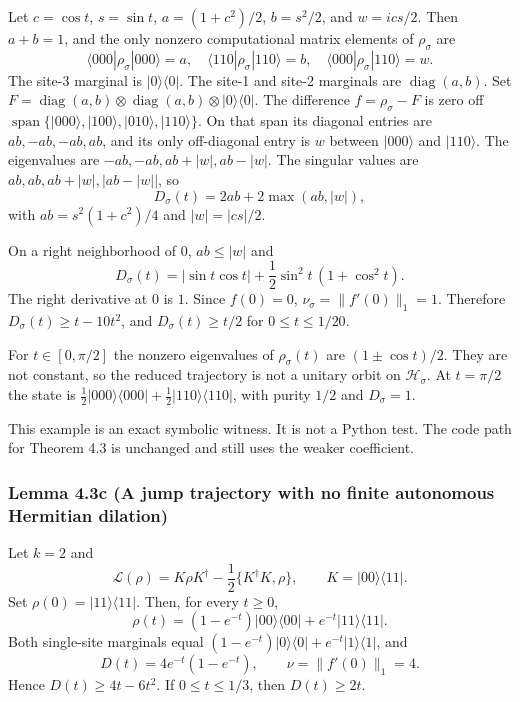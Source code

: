 \documentclass[
  11pt,
]{article}
\begin{document}
Let \(c=\cos t\), \(s=\sin t\), \(a=(1+c^2)/2\), \(b=s^2/2\), and
\(w=ics/2\). Then \(a+b=1\), and the only nonzero computational matrix
elements of \(\rho_\sigma\) are
\[
\langle000|\rho_\sigma|000\rangle=a,\quad
\langle110|\rho_\sigma|110\rangle=b,\quad
\langle000|\rho_\sigma|110\rangle=w.
\]
The site-3 marginal is \(|0\rangle\langle0|\). The site-1 and site-2
marginals are \(\operatorname{diag}(a,b)\). Set
\(F=\operatorname{diag}(a,b)\otimes\operatorname{diag}(a,b)\otimes|0\rangle\langle0|\).
The difference \(f=\rho_\sigma-F\) is zero off
\(\operatorname{span}\{|000\rangle,|100\rangle,|010\rangle,|110\rangle\}\).
On that span its diagonal entries are \(ab,-ab,-ab,ab\), and its only
off-diagonal entry is \(w\) between \(|000\rangle\) and \(|110\rangle\).
The eigenvalues are \(-ab,-ab,ab+|w|,ab-|w|\).
The singular values are \(ab,ab,ab+|w|,|ab-|w||\), so
\[
D_\sigma(t)=2ab+2\max(ab,|w|),
\]
with \(ab=s^2(1+c^2)/4\) and \(|w|=|cs|/2\).

On a right neighborhood of \(0\), \(ab\le|w|\) and
\[
D_\sigma(t)
=|\sin t\cos t|+\frac12\sin^2 t\,(1+\cos^2 t).
\]
The right derivative at \(0\) is \(1\). Since \(f(0)=0\),
\(\nu_\sigma=\|f'(0)\|_1=1\). Therefore
\(D_\sigma(t)\ge t-10t^2\), and \(D_\sigma(t)\ge t/2\) for
\(0\le t\le 1/20\).

For \(t\in[0,\pi/2]\) the nonzero eigenvalues of \(\rho_\sigma(t)\) are
\((1\pm\cos t)/2\). They are not constant, so the reduced trajectory is
not a unitary orbit on \(\mathcal H_\sigma\). At \(t=\pi/2\) the state
is \(\tfrac12|000\rangle\langle000|+\tfrac12|110\rangle\langle110|\),
with purity \(1/2\) and \(D_\sigma=1\).

This example is an exact symbolic witness. It is not a Python test.
The code path for Theorem 4.3 is unchanged and still uses the weaker
coefficient.

\subsubsection{Lemma 4.3c (A jump trajectory with no finite autonomous Hermitian dilation)}\label{lemma-4.3c-a-jump-trajectory-with-no-finite-autonomous-hermitian-dilation}

Let \(k=2\) and
\[
\mathcal L(\rho)
=K\rho K^\dagger-\frac12\{K^\dagger K,\rho\},\qquad
K=|00\rangle\langle11|.
\]
Set \(\rho(0)=|11\rangle\langle11|\). Then, for every \(t\ge 0\),
\[
\rho(t)
=(1-e^{-t})|00\rangle\langle00|+e^{-t}|11\rangle\langle11|.
\]
Both single-site marginals equal
\((1-e^{-t})|0\rangle\langle0|+e^{-t}|1\rangle\langle1|\), and
\[
D(t)=4e^{-t}(1-e^{-t}),\qquad
\nu=\|f'(0)\|_1=4.
\]
Hence \(D(t)\ge 4t-6t^2\). If \(0\le t\le 1/3\), then \(D(t)\ge 2t\).
\end{document}
